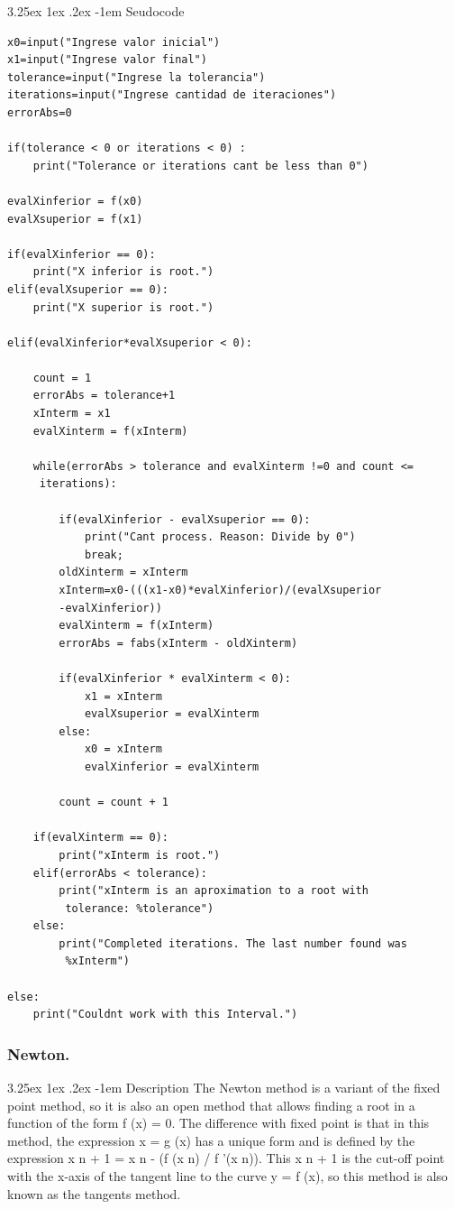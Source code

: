 \documentclass{article}
\makeatletter
\renewcommand\paragraph{\@startsection{paragraph}{5}{\z@}%
  {3.25ex \@plus1ex \@minus.2ex}%
  {-1em}%
  {\normalfont\normalsize\bfseries}}
\makeatother
\begin{document}
\paragraph{Seudocode}
\hfill \break
\begin{lstlisting}
x0=input("Ingrese valor inicial")
x1=input("Ingrese valor final")
tolerance=input("Ingrese la tolerancia")
iterations=input("Ingrese cantidad de iteraciones")
errorAbs=0

if(tolerance < 0 or iterations < 0) :
	print("Tolerance or iterations cant be less than 0")

evalXinferior = f(x0)
evalXsuperior = f(x1)

if(evalXinferior == 0):
	print("X inferior is root.")
elif(evalXsuperior == 0):
	print("X superior is root.")

elif(evalXinferior*evalXsuperior < 0):

	count = 1
	errorAbs = tolerance+1
	xInterm = x1
	evalXinterm = f(xInterm)

	while(errorAbs > tolerance and evalXinterm !=0 and count <=
	 iterations):

		if(evalXinferior - evalXsuperior == 0):
			print("Cant process. Reason: Divide by 0")
			break;
		oldXinterm = xInterm
		xInterm=x0-(((x1-x0)*evalXinferior)/(evalXsuperior
		-evalXinferior))
		evalXinterm = f(xInterm)
		errorAbs = fabs(xInterm - oldXinterm)

		if(evalXinferior * evalXinterm < 0):
			x1 = xInterm
			evalXsuperior = evalXinterm
        else:
			x0 = xInterm
			evalXinferior = evalXinterm

	    count = count + 1

	if(evalXinterm == 0):
		print("xInterm is root.")
    elif(errorAbs < tolerance):
		print("xInterm is an aproximation to a root with
		 tolerance: %tolerance")
    else:
		print("Completed iterations. The last number found was
		 %xInterm")

else:
	print("Couldnt work with this Interval.")

\end{lstlisting}

\subsubsection{Newton.}

\paragraph{Description}
\hfill \break
The Newton method is a variant of the fixed point method, so it is also an open method that allows finding a root in a function of the form f (x) = 0.
The difference with fixed point is that in this method, the expression x = g (x) has a unique form and is defined by the expression x n + 1 = x n - (f (x n) / f '(x n)). This x n + 1 is the cut-off point with the x-axis of the tangent line to the curve y = f (x), so this method is also known as the tangents method.
\end{document}
